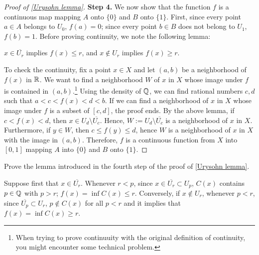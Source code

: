 \begin{proof}[Proof of \cref{Urysohn lemma}]
    \textbf{Step 4.}
    We now show that the function $f$ is a continuous map mapping $A$ onto $\{0\}$ and $B$ onto $\{1\}$.
    First, since every point $a\in A$ belongs to $U_0$, $f(a)=0$; since every point $b\in B$ does not belong to $U_1$, $f(b)=1$.
    Before proving continuity, we note the following lemma:
    \begin{center}
        $x\in\overline{U_r}$ implies $f(x)\leq r$, and $x\notin U_r$ implies $f(x)\geq r$.
    \end{center}
    To check the continuity, fix a point $x\in X$ and let $(a, b)$ be a neighborhood of $f(x)$ in ${\mathbb{R}}$.
    We want to find a neighborhood $W$ of $x$ in $X$ whose image under $f$ is contained in $(a, b)$.\footnote{When trying to prove continuuity with the original definition of continuity, you might encounter some technical problem.}
    Using the density of ${\mathbb{Q}}$, we can find rational numbers $c, d$ such that $a<c<f(x)<d<b$.
    If we can find a neighborhood of $x$ in $X$ whose image under $f$ is a subset of $[c, d]$, the proof ends.
    By the above lemma, if $c<f(x)<d$, then $x\in U_d\setminus\overline{U_c}$.
    Hence, $W:=U_d\setminus\overline{U_c}$ is a neighborhood of $x$ in $X$.
    Furthermore, if $y\in W$, then $c\leq f(y)\leq d$, hence $W$ is a neighborhood of $x$ in $X$ with the image in $(a, b)$.
    Therefore, $f$ is a continuous function from $X$ into $[0, 1]$ mapping $A$ into $\{0\}$ and $B$ onto $\{1\}$.
\end{proof}
\begin{prob}
    Prove the lemma introduced in the fourth step of the proof of \cref{Urysohn lemma}.
\end{prob}
\begin{sol}
    Suppose first that $x\in\overline{U_r}$.
    Whenever $r<p$, since $x\in\overline{U_r}\subset U_p$, $C(x)$ contains $p\in{\mathbb{Q}}$ with $p>r$; $f(x)=\inf C(x)\leq r$.
    Conversely, if $x\notin U_r$, whenever $p<r$, since $\overline{U_p}\subset U_r$, $p\notin C(x)$ for all $p<r$ and it implies that $f(x)=\inf C(x)\geq r$.
\end{sol}

